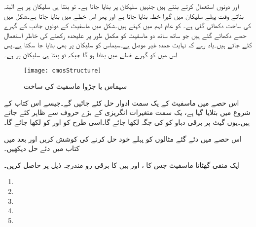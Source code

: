    اور   دونوں استعمال کرتے بنتے ہیں جنہیں   سلیکان پر بنایا جاتا ہے۔ تو بنتا ہی  سلیکان پر ہے البتہ  بناتے وقت پہلے  سلیکان میں گہرا  خطہ بنایا جاتا ہے اور پھر اس خطے میں  بنایا جاتا ہے۔شکل  میں  کی ساخت دکھائی گئی ہے۔ کو عام فہم میں  کہتے ہیں۔شکل میں ماسفیٹ کے دونوں جانب  کے گہرے حصے دکھائے گئے ہیں جو ساتھ ساتھ دو ماسفیٹ کو مکمل طور پر علیحدہ رکھنے کی خاطر استعمال کئے جاتے ہیں۔یاد رہے کہ  نہایت عمدہ غیر موصل ہے۔سیماس کو  سلیکان پر بھی بنایا جا سکتا ہے۔پس اس میں  کو گہرے  خطے میں بنانا ہو گا جبکہ  تو بنتا ہی  سلیکان پر ہے۔ 
\begin{figure}
\centering
\texttt{[image: cmosStructure]}
\caption{سیماس یا جڑوا ماسفیٹ کی ساخت}
\label{شکل_ماسفیٹ_سیماس_کی_ساخت}
\end{figure}

اس حصے میں ماسفیٹ کے یک سمت ادوار حل کئے جائیں گے۔جیسے اس کتاب کے شروع میں بتلایا گیا ہے، یک سمت متغیرات انگریزی کے بڑے حروف سے ظاہر کئے جاتے ہیں۔یوں گیٹ پر برقی دباو کو  کی جگہ  لکھا جائے گا۔اسی طرح  کو  اور  کو  لکھا جائے گا۔

اس حصے میں دئے گئے مثالوں کو پہلے خود حل کرنے کی کوشش کریں اور بعد میں کتاب میں دئے حل دیکھیں۔

ایک منفی  گھٹاتا ماسفیٹ جس کا ،  اور
  ہیں کا برقی رو مندرجہ ذیل پر حاصل کریں۔
\begin{enumerate}
\item
{}
\item
{}
\item
{}
\item
{}
\item
{}

\end{enumerate}




